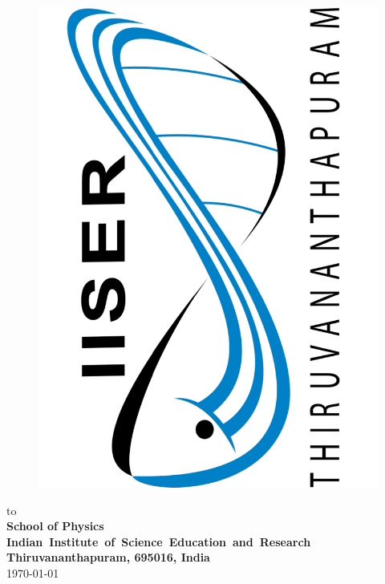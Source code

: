 \documentclass[12pt, a4wide]{report}
\begin{document}
\begin{titlepage}
\begin{center}
\begin{figure}[h]
  \begin{center}
  \includegraphics[scale=0.15, angle=-90]{./images/IISER_Logo.pdf}
  \end{center}
\end{figure}
\vspace*{3.5mm}
{to} \\ 
\vspace{2mm}
{\bf\large School of Physics} \\
{\bf\large \mbox{Indian Institute of Science Education and Research}}\\
{\bf\large Thiruvananthapuram, 695016, India}\\ 
\vspace{2mm}
\today
\end{center}
\end{titlepage}
\clearpage
\end{document}
